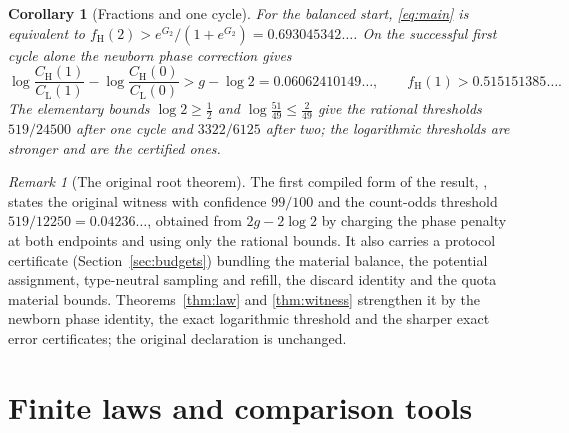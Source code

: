 \documentclass[11pt,a4paper]{article}
\theoremstyle{plain}
\newtheorem{corollary}[theorem]{Corollary}
\theoremstyle{definition}
\theoremstyle{remark}
\newtheorem{remark}[theorem]{Remark}
\newcommand{\lo}{\mathrm L}
\newcommand{\hi}{\mathrm H}
\begin{document}
\begin{corollary}[Fractions and one cycle]\label{cor:fraction}
For the balanced start, \eqref{eq:main} is equivalent to $f_\hi(2)>e^{G_2}/(1+e^{G_2})=0.693045342\ldots$. On the successful first cycle alone the newborn phase correction gives
\[
\log\frac{C_\hi(1)}{C_\lo(1)}-\log\frac{C_\hi(0)}{C_\lo(0)}>g-\log2=0.06062410149\ldots,\qquad f_\hi(1)>0.515151385\ldots .
\]
The elementary bounds $\log2\ge\frac12$ and $\log\frac{51}{49}\le\frac2{49}$ give the rational thresholds $519/24500$ after one cycle and $3322/6125$ after two; the logarithmic thresholds are stronger and are the certified ones.
\end{corollary}

\begin{remark}[The original root theorem]\label{rem:root}
The first compiled form of the result, , states the original witness with confidence $99/100$ and the count-odds threshold $519/12250=0.04236\ldots$, obtained from $2g-2\log2$ by charging the phase penalty at both endpoints and using only the rational bounds. It also carries a protocol certificate (Section~\ref{sec:budgets}) bundling the material balance, the potential assignment, type-neutral sampling and refill, the discard identity and the quota material bounds. Theorems~\ref{thm:law} and \ref{thm:witness} strengthen it by the newborn phase identity, the exact logarithmic threshold and the sharper exact error certificates; the original declaration is unchanged.
\end{remark}

\section{Finite laws and comparison tools}\label{sec:tools}
\end{document}

